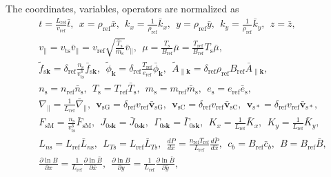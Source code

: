 The coordinates, variables, operators are normalized as 
\begin{align}
  &t = \frac{L_\mathrm{ref}}{v_\mathrm{ref}} \bar{t},~~
  x=\rho_\mathrm{ref} \bar{x},~~
  k_x = \frac{1}{\rho_\mathrm{ref}} \bar{k}_x,~~
  y=\rho_\mathrm{ref} \bar{y},~~
  k_y = \frac{1}{\rho_\mathrm{ref}} \bar{k}_y,~~
  z = \bar{z}, \nonumber \\
  &v_\parallel= v_\mathrm{ts} \bar{v}_\parallel = v_\mathrm{ref} \sqrt{\frac{\bar{T}_\mathrm{s}}{\bar{m}_\mathrm{s}}} \bar{v}_\parallel,~~
  \mu = \frac{T_\mathrm{s}}{B_\mathrm{ref}} \bar{\mu} = \frac{T_\mathrm{ref}}{B_\mathrm{ref}} T_\mathrm{s} \bar{\mu}, \nonumber \\
  &\tilde{f}_{\mathrm{s}\bm{k}} = \delta_\mathrm{ref} \frac{n_\mathrm{s}}{v_\mathrm{ts}^3} \bar{f}_{\mathrm{s}\bm{k}},~~
  \tilde{\phi}_{\bm{k}} = \delta_\mathrm{ref} \frac{T_\mathrm{ref}}{e_\mathrm{ref}}\bar{\phi}_{\bm{k}},~~
  \tilde{A}_{\parallel\bm{k}} = \delta_\mathrm{ref} \rho_\mathrm{ref} B_\mathrm{ref}\bar{A}_{\parallel\bm{k}}, \nonumber \\
  &n_\mathrm{s} = n_\mathrm{ref} \bar{n}_\mathrm{s},~~
  T_\mathrm{s} = T_\mathrm{ref} \bar{T}_\mathrm{s},~~
  m_\mathrm{s} = m_\mathrm{ref} \bar{m}_\mathrm{s},~~
  e_\mathrm{s} = e_\mathrm{ref} \bar{e}_\mathrm{s}, \nonumber \\
  &\nabla_\parallel = \frac{1}{L_\mathrm{ref}} \bar{\nabla}_\parallel,~~ 
  \bm{v}_{\mathrm{sG}} = \delta_\mathrm{ref} v_\mathrm{ref} \bar{\bm{v}}_{\mathrm{sG}},~~
  \bm{v}_{\mathrm{sC}} = \delta_\mathrm{ref} v_\mathrm{ref} \bar{\bm{v}}_{\mathrm{sC}},~~
  \bm{v}_{\mathrm{s}*} = \delta_\mathrm{ref} v_\mathrm{ref} \bar{\bm{v}}_{\mathrm{s}*}, \nonumber \\
  &F_\mathrm{sM} = \frac{n_\mathrm{s}}{v_\mathrm{ts}^3} \bar{F}_\mathrm{sM},~~
  J_{0\mathrm{s}\bm{k}} = \bar{J}_{0\mathrm{s}\bm{k}},~~
  \Gamma_{0\mathrm{s}\bm{k}} = \bar{\Gamma}_{0\mathrm{s}\bm{k}},~~
  K_x = \frac{1}{L_\mathrm{ref}} \bar{K}_x,~~
  K_y = \frac{1}{L_\mathrm{ref}} \bar{K}_y, \nonumber \\
  &L_{n\mathrm{s}} = L_\mathrm{ref} \bar{L}_{n\mathrm{s}},~~
  L_{T\mathrm{s}} = L_\mathrm{ref} \bar{L}_{T\mathrm{s}},~~
  \frac{dP}{dx} = \frac{n_\mathrm{ref}T_\mathrm{ref}}{L_\mathrm{ref}} \frac{d\bar{P}}{d\bar{x}},~~
  c_b = B_\mathrm{ref} \bar{c}_b,~~
  B = B_\mathrm{ref} \bar{B}, \nonumber \\
  &\frac{\partial \ln B}{\partial x} = \frac{1}{L_\mathrm{ref}} \frac{\partial \ln \bar{B}}{\partial \bar{x}},~~
  \frac{\partial \ln B}{\partial y} = \frac{1}{L_\mathrm{ref}} \frac{\partial \ln \bar{B}}{\partial \bar{y}},~~

\end{align}
